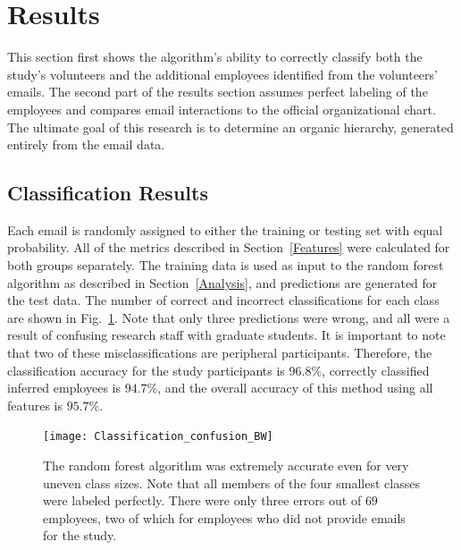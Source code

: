\documentclass[10pt,twocolumn,conference]{IEEEtran}
\begin{document}
\section{Results} \label{Results}
This section first shows the algorithm's ability to correctly classify both the study's volunteers and the additional employees identified from the volunteers' emails.
The second part of the results section assumes perfect labeling of the employees and compares email interactions to the official organizational chart.
The ultimate goal of this research is to determine an organic hierarchy, generated entirely from the email data.

\subsection{Classification Results}\label{ssec:class_results}
Each email is randomly assigned to either the training or testing set with equal probability.
All of the metrics described in Section~\ref{Features} were calculated for both groups separately.
The training data is used as input to the random forest algorithm as described in Section~\ref{Analysis}, and predictions are generated for the test data.
The number of correct and incorrect classifications for each class are shown in Fig.~\ref{fig:result_hist}.
Note that only three predictions were wrong, and all were a result of confusing research staff with graduate students.
It is important to note that two of these misclassifications are peripheral participants.
Therefore, the classification accuracy for the study participants is $96.8\%$, correctly classified inferred employees is $94.7\%$, and the overall accuracy of this method using all features is $95.7\%$.

\begin{figure}[t]
    \centering
    \texttt{[image: Classification\_confusion\_BW]}
    \caption{The random forest algorithm was extremely accurate even for very uneven class sizes.  Note that all members of the four smallest classes were labeled perfectly.  There were only three errors out of $69$ employees, two of which for employees who did not provide emails for the study.}
    \label{fig:result_hist}
\end{figure}
\end{document}
